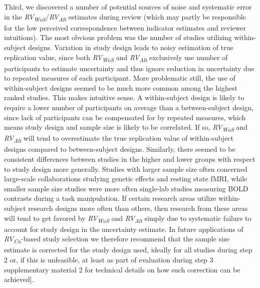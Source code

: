\documentclass[
  english,
  man,floatsintext]{apa6}
\begin{document}
Third, we discovered a number of potential sources of noise and systematic error in the \emph{RV\textsubscript{WoS}}/\emph{RV\textsubscript{Alt}} estimates during review (which may partly be responsible for the low perceived correspondence between indicator estimates and reviewer intuitions). The most obvious problem was the number of studies utilizing within-subject designs. Variation in study design leads to noisy estimation of true replication value, since both \emph{RV\textsubscript{WoS}} and \emph{RV\textsubscript{Alt}} exclusively use number of participants to estimate uncertainty and thus ignore reduction in uncertainty due to repeated measures of each participant. More problematic still, the use of within-subject designs seemed to be much more common among the highest ranked studies. This makes intuitive sense. A within-subject design is likely to require a lower number of participants on average than a between-subject design, since lack of participants can be compensated for by repeated measures, which means study design and sample size is likely to be correlated. If so, \emph{RV\textsubscript{WoS}} and \emph{RV\textsubscript{Alt}} will tend to overestimate the true replication value of within-subject designs compared to between-subject designs. Similarly, there seemed to be consistent differences between studies in the higher and lower groups with respect to study design more generally. Studies with larger sample size often concerned large-scale collaborations studying genetic effects and resting state fMRI, while smaller sample size studies were more often single-lab studies measuring BOLD contrasts during a task manipulation. If certain research areas utilize within-subject research designs more often than others, then research from these areas will tend to get favored by \emph{RV\textsubscript{WoS}} and \emph{RV\textsubscript{Alt}} simply due to systematic failure to account for study design in the uncertainty estimate. In future applications of \emph{RV\textsubscript{Cn}}-based study selection we therefore recommend that the sample size estimate is corrected for the study design used, ideally for all studies during step 2 or, if this is unfeasible, at least as part of evaluation during step 3 supplementary material 2 for technical details on how such correction can be achieved{]}.
\end{document}
